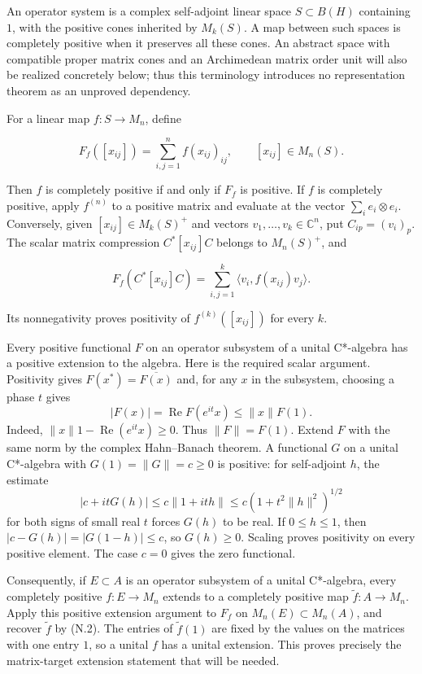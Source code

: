 \documentclass[
  11pt,
]{article}
\begin{document}
An operator system is a complex self-adjoint linear space
\(S\subset B(H)\) containing \(1\), with the positive cones inherited by
\(M_k(S)\). A map between such spaces is completely positive when it
preserves all these cones. An abstract space with compatible proper
matrix cones and an Archimedean matrix order unit will also be realized
concretely below; thus this terminology introduces no representation
theorem as an unproved dependency.

For a linear map \(f:S\to M_n\), define

\[
F_f([x_{ij}])=\sum_{i,j=1}^n f(x_{ij})_{ij},
\qquad [x_{ij}]\in M_n(S).
\tag{N.2}
\]

Then \(f\) is completely positive if and only if \(F_f\) is positive. If
\(f\) is completely positive, apply \(f^{(n)}\) to a positive matrix and
evaluate at the vector \(\sum_i e_i\otimes e_i\). Conversely, given
\([x_{ij}]\in M_k(S)^+\) and vectors \(v_1,\ldots,v_k\in\mathbb C^n\),
put \(C_{ip}=(v_i)_p\). The scalar matrix compression \(C^*[x_{ij}]C\)
belongs to \(M_n(S)^+\), and

\[
F_f(C^*[x_{ij}]C)
=\sum_{i,j=1}^k\langle v_i,f(x_{ij})v_j\rangle.
\]

Its nonnegativity proves positivity of \(f^{(k)}([x_{ij}])\) for every
\(k\).

Every positive functional \(F\) on an operator subsystem of a unital
C*-algebra has a positive extension to the algebra. Here is the required
scalar argument. Positivity gives \(F(x^*)=\overline{F(x)}\) and, for
any \(x\) in the subsystem, choosing a phase \(t\) gives \[
|F(x)|=\operatorname{Re}F(e^{it}x)
\leq \|x\|F(1).
\] Indeed, \(\|x\|1-\operatorname{Re}(e^{it}x)\geq0\). Thus
\(\|F\|=F(1)\). Extend \(F\) with the same norm by the complex
Hahn--Banach theorem. A functional \(G\) on a unital C*-algebra with
\(G(1)=\|G\|=c\geq0\) is positive: for self-adjoint \(h\), the estimate
\[
|c+itG(h)|\leq c\|1+ith\|
\leq c(1+t^2\|h\|^2)^{1/2}
\] for both signs of small real \(t\) forces \(G(h)\) to be real. If
\(0\leq h\leq1\), then \(|c-G(h)|=|G(1-h)|\leq c\), so \(G(h)\geq0\).
Scaling proves positivity on every positive element. The case \(c=0\)
gives the zero functional.

Consequently, if \(E\subset A\) is an operator subsystem of a unital
C*-algebra, every completely positive \(f:E\to M_n\) extends to a
completely positive map \(\widetilde f:A\to M_n\). Apply this positive
extension argument to \(F_f\) on \(M_n(E)\subset M_n(A)\), and recover
\(\widetilde f\) by (N.2). The entries of \(\widetilde f(1)\) are fixed
by the values on the matrices with one entry \(1\), so a unital \(f\)
has a unital extension. This proves precisely the matrix-target
extension statement that will be needed.
\end{document}

